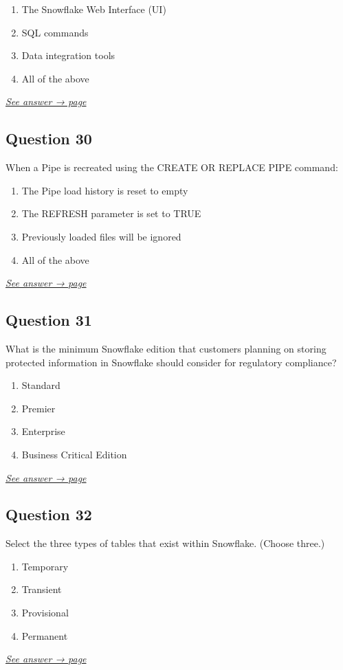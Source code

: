 \documentclass[12pt]{article}
\newcommand{\seeanswer}[1]{%
  \par\smallskip\emph{\hyperref[ans:#1]{See answer → page \pageref{ans:#1}}}%
}
\begin{document}
\begin{enumerate}[label=\Alph*.]
  \item The Snowflake Web Interface (UI)
  \item SQL commands
  \item Data integration tools
  \item All of the above
\end{enumerate}
\seeanswer{29}

\subsection*{Question 30}\label{q:30}
When a Pipe is recreated using the CREATE OR REPLACE PIPE command:

\begin{enumerate}[label=\Alph*.]
  \item The Pipe load history is reset to empty
  \item The REFRESH parameter is set to TRUE
  \item Previously loaded files will be ignored
  \item All of the above
\end{enumerate}
\seeanswer{30}

\subsection*{Question 31}\label{q:31}
What is the minimum Snowflake edition that customers planning on storing protected information in Snowflake should consider for regulatory compliance?

\begin{enumerate}[label=\Alph*.]
  \item Standard
  \item Premier
  \item Enterprise
  \item Business Critical Edition
\end{enumerate}
\seeanswer{31}

\subsection*{Question 32}\label{q:32}
Select the three types of tables that exist within Snowflake. (Choose three.)

\begin{enumerate}[label=\Alph*.]
  \item Temporary
  \item Transient
  \item Provisional
  \item Permanent
\end{enumerate}
\seeanswer{32}
\end{document}
